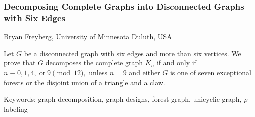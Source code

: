 \documentclass[12pt]{article}
\begin{document}
 
  \subsubsection*{Decomposing Complete Graphs into Disconnected Graphs with Six Edges}

  Bryan Freyberg, University of Minnesota Duluth, USA
  \medskip
  
Let $G$ be a disconnected graph with six edges and more than six vertices. We prove that $G$ decomposes the complete graph $K_n$ if and only if $n \equiv 0,1,4, \; \text{or} \; 9 \pmod{12},$ unless $n=9$ and either $G$ is one of seven exceptional forests or the disjoint union of a triangle and a claw. 
  
  \medskip

  Keywords:  graph decomposition, graph designs, forest graph, unicyclic graph, $\rho$-labeling
\end{document}

